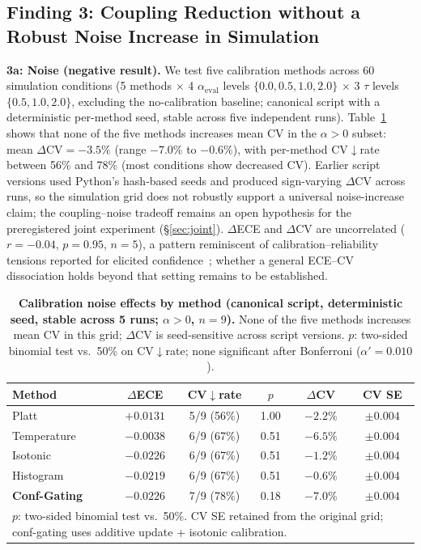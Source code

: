 \documentclass[11pt]{article}
\newcommand{\CV}{\ensuremath{\mathrm{CV}}}
\theoremstyle{definition}
\theoremstyle{remark}
\begin{document}
\subsection{Finding 3: Coupling Reduction without a Robust Noise Increase in Simulation}

\textbf{3a: Noise (negative result).} We test five calibration methods across 60 simulation conditions (5 methods $\times$ 4 $\alpha_{\text{eval}}$ levels $\{0.0, 0.5, 1.0, 2.0\}$ $\times$ 3 $\tau$ levels $\{0.5, 1.0, 2.0\}$, excluding the no-calibration baseline; canonical script with a deterministic per-method seed, stable across five independent runs). Table~\ref{tab:noise} shows that none of the five methods increases mean CV in the $\alpha{>}0$ subset: mean $\Delta\CV = -3.5\%$ (range $-7.0\%$ to $-0.6\%$), with per-method CV$\downarrow$rate between 56\% and 78\% (most conditions show decreased CV). Earlier script versions used Python's hash-based seeds and produced sign-varying $\Delta\CV$ across runs, so the simulation grid does not robustly support a universal noise-increase claim; the coupling--noise tradeoff remains an open hypothesis for the preregistered joint experiment (\S\ref{sec:joint}). $\Delta$ECE and $\Delta$CV are uncorrelated ($r = -0.04$, $p = 0.95$, $n{=}5$), a pattern reminiscent of calibration--reliability tensions reported for elicited confidence~\citep{tian2023calibration}; whether a general ECE--CV dissociation holds beyond that setting remains to be established.

\begin{table}[H]
\centering
\caption{\textbf{Calibration noise effects by method (canonical script, deterministic seed, stable across 5 runs; $\alpha{>}0$, $n{=}9$).} None of the five methods increases mean CV in this grid; $\Delta\CV$ is seed-sensitive across script versions. $p$: two-sided binomial test vs.\ 50\% on CV$\downarrow$rate; none significant after Bonferroni ($\alpha' = 0.010$).}
\label{tab:noise}
\begin{tabular}{@{}lccccc@{}}
\toprule
Method & $\Delta$ECE & CV$\downarrow$rate & $p$ & $\Delta$CV & CV SE \\
\midrule
Platt & $+0.0131$ & 5/9 (56\%) & 1.00 & $-2.2\%$ & $\pm 0.004$ \\
Temperature & $-0.0038$ & 6/9 (67\%) & 0.51 & $-6.5\%$ & $\pm 0.004$ \\
Isotonic & $-0.0226$ & 6/9 (67\%) & 0.51 & $-1.2\%$ & $\pm 0.004$ \\
Histogram & $-0.0219$ & 6/9 (67\%) & 0.51 & $-0.6\%$ & $\pm 0.004$ \\
\midrule
\textbf{Conf-Gating} & $\mathbf{-0.0226}$ & 7/9 (78\%) & 0.18 & $\mathbf{-7.0\%}$ & $\pm 0.004$ \\
\bottomrule
\multicolumn{6}{l}{\footnotesize $p$: two-sided binomial test vs.\ 50\%. CV SE retained from the original grid; conf-gating uses additive update + isotonic calibration.} \\
\end{tabular}
\end{table}
\end{document}
